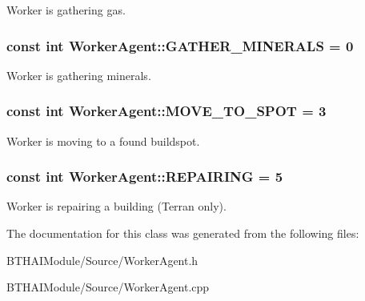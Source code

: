 Worker is gathering gas. \hypertarget{class_worker_agent_a80799cc5623ce3f7715df650c2758180}{
\subsubsection[{G\-A\-T\-H\-E\-R\-\_\-\-M\-I\-N\-E\-R\-A\-L\-S}]{\setlength{\rightskip}{0pt plus 5cm}const int Worker\-Agent\-::\-G\-A\-T\-H\-E\-R\-\_\-\-M\-I\-N\-E\-R\-A\-L\-S = 0\hspace{0.3cm}{\ttfamily [static]}}}\label{class_worker_agent_a80799cc5623ce3f7715df650c2758180}
Worker is gathering minerals. \hypertarget{class_worker_agent_a0101af42f6c248f24f8e4ae5d9d9b89c}{
\subsubsection[{M\-O\-V\-E\-\_\-\-T\-O\-\_\-\-S\-P\-O\-T}]{\setlength{\rightskip}{0pt plus 5cm}const int Worker\-Agent\-::\-M\-O\-V\-E\-\_\-\-T\-O\-\_\-\-S\-P\-O\-T = 3\hspace{0.3cm}{\ttfamily [static]}}}\label{class_worker_agent_a0101af42f6c248f24f8e4ae5d9d9b89c}
Worker is moving to a found buildspot. \hypertarget{class_worker_agent_ad395f66af8916a07f16d08f8c2c4f555}{
\subsubsection[{R\-E\-P\-A\-I\-R\-I\-N\-G}]{\setlength{\rightskip}{0pt plus 5cm}const int Worker\-Agent\-::\-R\-E\-P\-A\-I\-R\-I\-N\-G = 5\hspace{0.3cm}{\ttfamily [static]}}}\label{class_worker_agent_ad395f66af8916a07f16d08f8c2c4f555}
Worker is repairing a building (Terran only). 

The documentation for this class was generated from the following files\-:\begin{DoxyCompactItemize}
\item 
B\-T\-H\-A\-I\-Module/\-Source/Worker\-Agent.\-h\item 
B\-T\-H\-A\-I\-Module/\-Source/Worker\-Agent.\-cpp\end{DoxyCompactItemize}
